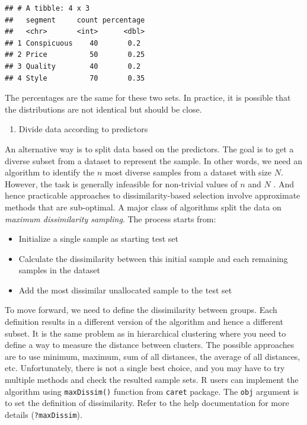 \documentclass[
  12pt,
]{krantz}
\providecommand{\tightlist}{%
  \setlength{\itemsep}{0pt}\setlength{\parskip}{0pt}}
\begin{document}
\begin{verbatim}
## # A tibble: 4 x 3
##   segment     count percentage
##   <chr>       <int>      <dbl>
## 1 Conspicuous    40       0.2 
## 2 Price          50       0.25
## 3 Quality        40       0.2 
## 4 Style          70       0.35
\end{verbatim}

The percentages are the same for these two sets. In practice, it is possible that the distributions are not identical but should be close.

\begin{enumerate}
\def\labelenumi{(\arabic{enumi})}
\setcounter{enumi}{1}
\tightlist
\item
  Divide data according to predictors
\end{enumerate}

An alternative way is to split data based on the predictors. The goal is to get a diverse subset from a dataset to represent the sample. In other words, we need an algorithm to identify the \(n\) most diverse samples from a dataset with size \(N\). However, the task is generally infeasible for non-trivial values of \(n\) and \(N\) \citep{willett}. And hence practicable approaches to dissimilarity-based selection involve approximate methods that are sub-optimal. A major class of algorithms split the data on \emph{maximum dissimilarity sampling}. The process starts from:

\begin{itemize}
\tightlist
\item
  Initialize a single sample as starting test set
\item
  Calculate the dissimilarity between this initial sample and each remaining samples in the dataset
\item
  Add the most dissimilar unallocated sample to the test set
\end{itemize}

To move forward, we need to define the dissimilarity between groups. Each definition results in a different version of the algorithm and hence a different subset. It is the same problem as in hierarchical clustering where you need to define a way to measure the distance between clusters. The possible approaches are to use minimum, maximum, sum of all distances, the average of all distances, etc. Unfortunately, there is not a single best choice, and you may have to try multiple methods and check the resulted sample sets. R users can implement the algorithm using \texttt{maxDissim()} function from \texttt{caret} package. The \texttt{obj} argument is to set the definition of dissimilarity. Refer to the help documentation for more details (\texttt{?maxDissim}).
\end{document}
